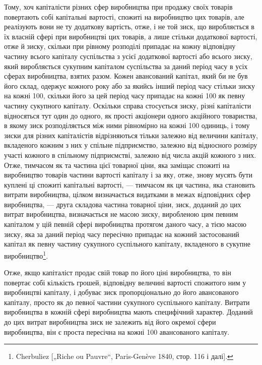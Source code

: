 Тому, хоч капіталісти різних сфер виробництва при продажу
своїх товарів повертають собі капітальні вартості, спожиті на
виробництво цих товарів, але реалізують вони не ту додаткову
вартість, отже, і не той зиск, що виробляється в їх власній
сфері при виробництві цих товарів, а лише стільки додаткової вартості, отже й зиску, скільки при
рівному розподілі
припадає на кожну відповідну частину всього капіталу суспільства з усієї додаткової вартості або
всього зиску, який виробляється сукупним капіталом суспільства за даний період часу
в усіх сферах виробництва, взятих разом. Кожен авансований
капітал, який би не був його склад, одержує кожного року або
за якийсь інший період часу стільки зиску на кожні 100, скільки
його за цей період часу припадає на кожні 100 як певну частину
сукупного капіталу. Оскільки справа стосується зиску, різні капіталісти відносяться тут один до
одного, як прості акціонери
одного акційного товариства, в якому зиск розподіляється між
ними рівномірно на кожні 100 одиниць, і тому зиски для різних
капіталістів відрізняються тільки залежно від величини капіталу,
вкладеного кожним з них у спільне підприємство, залежно від
відносного розміру участі кожного в спільному підприємстві,
залежно від числа акцій кожного з них. Отже, тимчасом як та
частина цієї товарної ціни, яка заміщає спожиті на виробництво
товарів частини вартості капіталу і за яку, отже, знову мусять
бути куплені ці спожиті капітальні вартості, — тимчасом як ця
частина, яка становить витрати виробництва, цілком визначається
видатками в межах відповідних сфер виробництва, — друга складова частина товарної ціни, зиск,
доданий до цих витрат виробництва, визначається не масою зиску, виробленою цим певним
капіталом у цій певній сфері виробництва протягом даного
часу, а тією масою зиску, яка за даний період часу пересічно припадає на кожний застосований капітал
як певну частину
сукупного суспільного капіталу, вкладеного в сукупне
виробництво\footnote{
Cherbuliez [„Riche ou Pauvre“, Paris-Genève 1840, стор. 116 і далі].
}.

Отже, якщо капіталіст продає свій товар по його ціні виробництва, то він повертає собі кількість
грошей, відповідну величині вартості спожитого ним у виробництві капіталу, і добуває зиск
пропорціонально до його авансованого капіталу, просто
як до певної частини сукупного суспільного капіталу. Витрати
виробництва в кожній сфері виробництва мають специфічний
характер. Доданий до цих витрат виробництва зиск не залежить від його окремої сфери виробництва, він
є проста пересічна
на кожні 100 авансованого капіталу.

